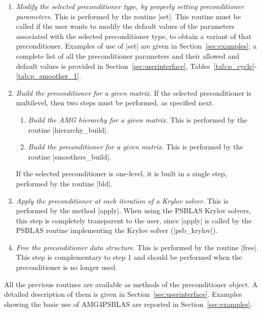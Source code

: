 \begin{enumerate}
\item \emph{Modify the selected preconditioner type, by properly
    setting   preconditioner parameters.} This is performed by the
  routine \fortinline|set|.   This routine must be called if the
  user wants to modify the default values  of the parameters
  associated with the selected preconditioner type, to obtain a
  variant   of that preconditioner. Examples of use of
  \fortinline|set| are given in   Section~\ref{sec:examples}; a
  complete list of all the   preconditioner parameters and their
  allowed and default values is provided in
  Section~\ref{sec:userinterface},
  Tables~\ref{tab:p_cycle}-\ref{tab:p_smoother_1}. 
\item \emph{Build the preconditioner for a given matrix}. If the selected preconditioner
 is multilevel, then two steps must be performed, as specified next.
\begin{enumerate}
\item[4.1] \emph{Build the AMG hierarchy for a given matrix.} This is
performed by the routine \fortinline|hierarchy_build|.
\item[4.2] \emph{Build the preconditioner for a given matrix.} This is performed
by the routine \fortinline|smoothers_build|.
\end{enumerate}
 If the selected preconditioner is one-level, it is built in a single step,
performed by the routine \fortinline|bld|.
\item \emph{Apply the preconditioner at each iteration of a Krylov solver.}
  This is performed by the method \fortinline|apply|. When using the PSBLAS Krylov solvers,
  this step is completely transparent to the user, since \fortinline|apply| is called
  by the PSBLAS routine implementing the Krylov solver (\fortinline|psb_krylov|).
\item \emph{Free the preconditioner data structure}. This is performed by
  the routine \fortinline|free|. This step is complementary to step 1 and should
  be performed when the preconditioner is no longer used.
\end{enumerate}

All the previous routines are available as methods of the preconditioner object.
A detailed description of them is given in Section~\ref{sec:userinterface}.
Examples showing the basic use of AMG4PSBLAS are reported in Section~\ref{sec:examples}.

